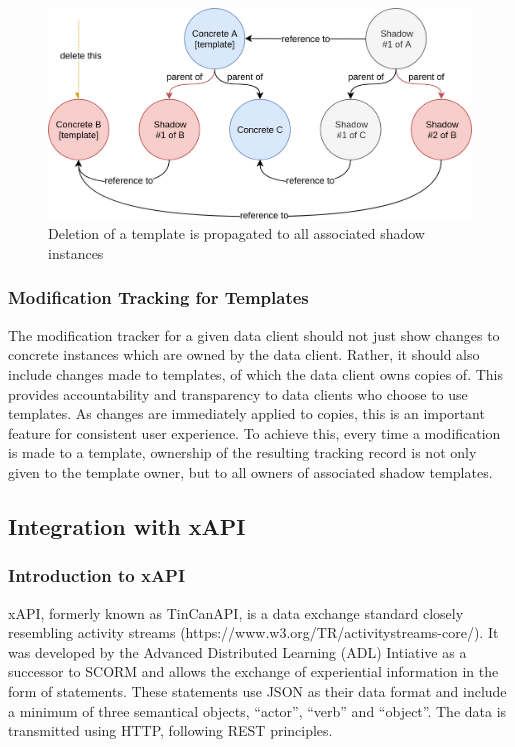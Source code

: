 \documentclass[a4paper,11pt]{article}
\begin{document}
                    \begin{figure}[H]
                        \centering
                        \includegraphics[width=.9\textwidth]{delete-template}
                        \caption{Deletion of a template is propagated to all associated shadow instances}
                        \label{fig:delete-template}
                    \end{figure}

                \subsubsection{Modification Tracking for Templates}
                    The modification tracker for a given data client should not 
                    just show changes to concrete instances which are owned by
                    the data client. Rather, it should also include changes
                    made to templates, of which the data client owns copies of.
                    This provides accountability and transparency to data clients
                    who choose to use templates. As changes are immediately applied
                    to copies, this is an important feature for consistent user
                    experience. To achieve this, every time a modification
                    is made to a template, ownership of the resulting tracking record 
                    is not only given to the template owner, but to all
                    owners of associated shadow templates.

            \subsection{Integration with xAPI}
                \subsubsection{Introduction to xAPI}
                    xAPI, formerly known as TinCanAPI, is a data exchange
                    standard closely resembling activity streams (https://www.w3.org/TR/activitystreams-core/).
                    It was developed by the Advanced Distributed Learning (ADL) Intiative
                    as a successor to SCORM and allows the exchange of experiential
                    information in the form of statements. These statements
                    use JSON as their data format and include a minimum of three
                    semantical objects, ``actor'', ``verb'' and ``object''. 
                    The data is transmitted using HTTP, following REST principles.
\end{document}

